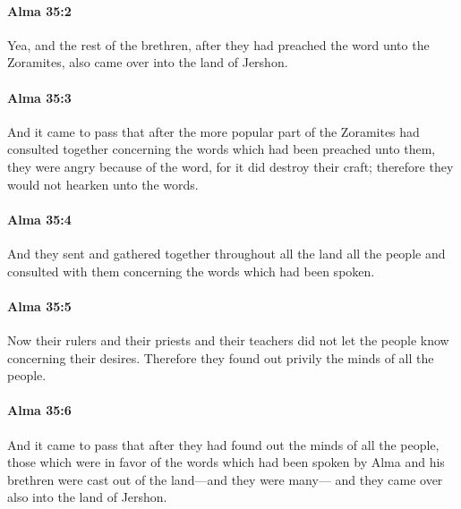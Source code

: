 		\paragraph{Alma 35:2} %
			\label{ALMA-35-2}

			Yea, and the rest of the brethren,
			after they had preached the word unto the Zoramites,
			also came over into the land of Jershon.

		\paragraph{Alma 35:3} %
			\label{ALMA-35-3}

			And it came to pass that
			after the more popular part of the Zoramites had consulted together
			concerning the words which had been preached unto them,
			they were angry because of the word,
			for it did destroy their craft;
			therefore they would not hearken unto the words.

		\paragraph{Alma 35:4} %
			\label{ALMA-35-4}

			And they sent and gathered together throughout all the land all the people
			and consulted with them concerning the words which had been spoken.

		\paragraph{Alma 35:5} %
			\label{ALMA-35-5}

			Now their rulers and their priests and their teachers
			did not let the people know concerning their desires.
			Therefore they found out privily the minds of all the people.

		\paragraph{Alma 35:6} %
			\label{ALMA-35-6}

			And it came to pass that after they had found out the minds of all the people,
			those which were in favor of the words
			which had been spoken by Alma and his brethren
			were cast out of the land---and they were many---
			and they came over also into the land of Jershon.


